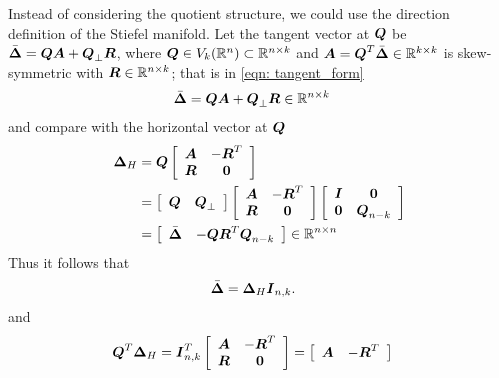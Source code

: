 \documentclass[11pt]{article}
\begin{document}
Instead of considering the quotient structure, we could use the direction definition of the Stiefel manifold.  Let the tangent vector at $\boldsymbol{Q}$ be $\bar{\boldsymbol{\Delta}} = \boldsymbol{Q}\boldsymbol{A} + \boldsymbol{Q}_{\bot}\boldsymbol{R}$, where $\boldsymbol{Q}\in V_{k}({\mathbb R}^{n}) \subset {\mathbb R}^{n\times k}$ and $\boldsymbol{A} = \boldsymbol{Q}^{T}\bar{\boldsymbol{\Delta}} \in {\mathbb R}^{k\times k}$ is skew-symmetric with $\boldsymbol{R} \in {\mathbb R}^{n\times k}$; that is in \eqref{eqn: tangent_form}
\begin{align*}
\bar{\boldsymbol{\Delta}} &= \boldsymbol{Q}\boldsymbol{A} + \boldsymbol{Q}_{\bot}\boldsymbol{R}  \in {\mathbb R}^{n\times k}\,
\end{align*}
and compare with the horizontal vector at $\boldsymbol{Q}$
\begin{align*}
\boldsymbol{\Delta}_{H}  &=\boldsymbol{Q}\left[\begin{array}{cc}
\boldsymbol{A} & -\boldsymbol{R}^{T} \\ 
\boldsymbol{R}& \boldsymbol{0}
\end{array} \right] \\
&= \left[\begin{array}{cc}
\boldsymbol{Q} & \boldsymbol{Q}_{\bot}
\end{array} \right]\left[\begin{array}{cc}
\boldsymbol{A} & -\boldsymbol{R}^{T} \\ 
\boldsymbol{R}& \boldsymbol{0}
\end{array} \right]\left[\begin{array}{cc}
\boldsymbol{I} & \boldsymbol{0} \\ 
\boldsymbol{0} & \boldsymbol{Q}_{n-k}
\end{array}\right] \\
&= \left[\begin{array}{cc}
\bar{\boldsymbol{\Delta}} & -\boldsymbol{Q} \boldsymbol{R}^{T}\boldsymbol{Q}_{n-k}
\end{array} \right] \in {\mathbb R}^{n\times n}
\end{align*}
Thus it follows that
\begin{align*}
\bar{\boldsymbol{\Delta}} &= \boldsymbol{\Delta}_{H}\boldsymbol{I}_{n,k}.
\end{align*}
 and 
 \begin{align*}
 \boldsymbol{Q}^{T} \boldsymbol{\Delta}_{H} &=\boldsymbol{I}_{n,k}^{T}\left[\begin{array}{cc}
\boldsymbol{A} & -\boldsymbol{R}^{T} \\ 
\boldsymbol{R}& \boldsymbol{0}
\end{array} \right] = \left[\begin{array}{cc}
\boldsymbol{A} & -\boldsymbol{R}^{T}
\end{array} \right]
 \end{align*}
\end{document}
